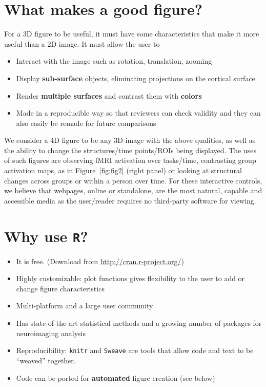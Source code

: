 \documentclass[final]{beamer}\usepackage{graphicx, color}
\begin{document}
\begin{frame}[fragile]
\begin{multicols}{2}
\section{What makes a good figure?}
For a 3D figure to be useful, it must have some characteristics that make it more useful than a 2D image.  It must allow the user to 
\begin{itemize}
\item Interact with the image such as rotation, translation, zooming
\item Display {\bf sub-surface} objects, eliminating projections on the cortical surface 
\item Render {\bf multiple surfaces} and contrast them with {\bf colors}
\item Made in a reproducible way so that reviewers can check validity and they can also easily be remade for future comparisons
\end{itemize}

We consider a 4D figure to be any 3D image with the above qualities, as well as the ability to change the structures/time points/ROIs being displayed.  The uses of such figures are observing fMRI activation over tasks/time, contrasting group activation maps, as in Figure~\ref{fig:fig2} (right panel) or looking at structural changes across groups or within a person over time.  For these interactive controls, we believe that webpages, online or standalone, are the most natural, capable and accessible media as the user/reader requires no third-party software for viewing.
\vfill
\columnbreak
 
\section{Why use \texttt{R}?}

\begin{itemize}
\item It is free.  (Download from \url{http://cran.r-project.org/})
\item Highly customizable: plot functions gives flexibility to the user to add or change figure characteristics
\item Multi-platform and a large user community
\item Has state-of-the-art statistical methods and a growing number of packages for neuroimaging analysis
\item Reproducibility: \texttt{knitr} and \texttt{Sweave} are tools that allow code and text to be ``weaved'' together.
\item Code can be ported for {\bf automated} figure creation (see below)
\end{itemize}





\end{multicols}
\end{frame}
\end{document}

